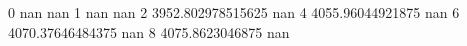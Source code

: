 0 nan nan
1 nan nan
2 3952.802978515625 nan
4 4055.96044921875 nan
6 4070.37646484375 nan
8 4075.8623046875 nan

